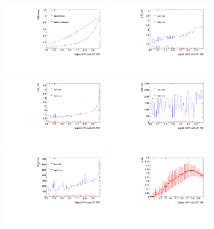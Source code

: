 \begin{figure}[h]
\begin{center}
\includegraphics[width = 0.4\textwidth,angle=-90]{fig/SigOpt/nonres/Efficiency_mumu.pdf}
\includegraphics[width = 0.4\textwidth,angle=-90]{fig/SigOpt/nonres/mindR_l2j_mumu.pdf}
\includegraphics[width = 0.4\textwidth,angle=-90]{fig/SigOpt/nonres/mindR_l1j_mumu.pdf}
\includegraphics[width = 0.4\textwidth,angle=-90]{fig/SigOpt/nonres/m_ll_mumu.pdf}
\includegraphics[width = 0.4\textwidth,angle=-90]{fig/SigOpt/nonres/m_l1jj_mumu.pdf}
\includegraphics[width = 0.4\textwidth,angle=-90]{fig/SigOpt/nonres/SOverRootB_mumu.pdf}

\end{center}
\end{figure}
